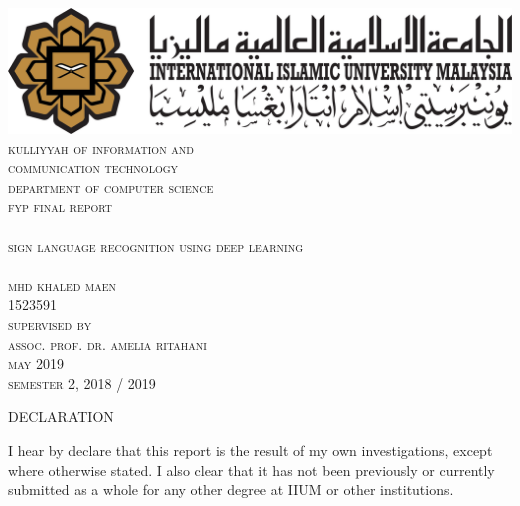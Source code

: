 \documentclass[12pt]{report}
\begin{document}
\begin{titlepage}
    \center
    \includegraphics[width = 15 cm]{./images/iium.png}
    \textsc{\LARGE }\\[1 cm]
    \textsc{\LARGE kulliyyah of information and}\\[.1 cm]
    \textsc{\LARGE communication technology}\\[1 cm]
    \textsc{\Large department of computer science}\\ [ .2 cm]
    \textsc{\large fyp final report}\\ [.5 cm]
    \hrulefill \\[0.2cm]
    \textsc{\Large sign language recognition using deep learning}\\
    \hrulefill \\[1 cm]
    
    \textsc{\large mhd khaled maen}\\[.1 cm]
    \textsc{1523591}\\ [1 cm]
    
    
    \textsc{\large supervised by}\\[.1 cm]
    \textsc{\large assoc. prof. dr. amelia ritahani}\\[2 cm]
    
    \textsc{\large may} 2019\\ [.2 cm]
    \textsc{\large semester} 2, 2018 / 2019 \\
    
\end{titlepage}

\begin{center}
    \LARGE DECLARATION
\end{center}   

I hear by declare that this report is the result of my own investigations,
except where otherwise stated. I also clear that it 
has not been previously or currently submitted as a whole for any other degree 
at IIUM or other institutions.
\end{document}
